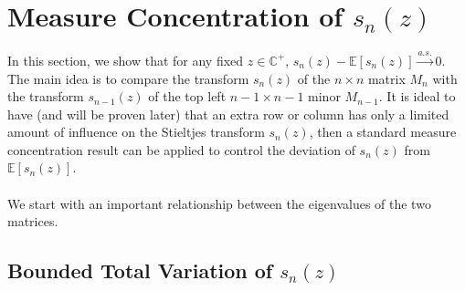 \documentclass{article}
\begin{document}
\section{Measure Concentration of $s_n(z)$}
In this section, we show that for any fixed $z \in \mathbb{C}^+$, $s_n(z) - \mathbb{E}[s_n(z)] \stackrel{a.s.}{\longrightarrow} 0$.\\
The main idea is to compare the transform $s_n(z)$ of the $n \times n$ matrix $M_n$ with the transform $s_{n - 1}(z)$ of the top left $ n-1 \times n-1$ minor $M_{n-1}$. It is ideal to have (and will be proven later) that an extra row or column has only a limited amount of influence on the Stieltjes transform $s_n(z)$, then a standard measure concentration result can be applied to control the deviation of $s_n(z)$ from $\mathbb{E}[s_n(z)]$.\\
\\
We start with an important relationship between the eigenvalues of the two matrices.
\subsection{Bounded Total Variation of $s_n(z)$}
\end{document}
